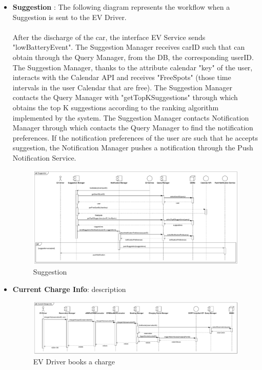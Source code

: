 \begin{itemize}
    \item \textbf{Suggestion} : The following diagram represents the workflow when a Suggestion is sent to the EV Driver.\\
          \\After the discharge of the car, the interface EV Service sends "lowBatteryEvent".
          The Suggestion Manager receives carID such that can obtain through the Query Manager, from the DB, the corresponding userID.
          The Suggestion Manager, thanks to the attribute calendar "key" of the user, interacts with the Calendar API and receives "FreeSpots" (those
          time intervals in the user Calendar that are free).
          The Suggestion Manager contacts the Query Manager with "getTopKSuggestions" through which obtains the top K suggestions according
          to the ranking algorithm implemented by the system.
          The Suggestion Manager contacts Notification Manager through which contacts the Query Manager to find the notification preferences.
          If the notification preferences of the user are such that he accepts suggestion, the Notification Manager pushes a notification through the Push Notification Service.
          \\
          \begin{figure}[H]
              \centering
              \hspace*{-2cm}
              \includegraphics[scale=0.48]{src/runtimeView/eMSP_Suggestion.pdf}
              \caption{Suggestion}
          \end{figure}

    \item \textbf{Current Charge Info}: description
          \\\begin{figure}[H]
              \centering
              \hspace*{-2cm}
              \includegraphics[scale=0.44]{src/runtimeView/eMSP_currentChargeInfo.pdf}
              \caption{EV Driver books a charge}
          \end{figure}
\end{itemize}

